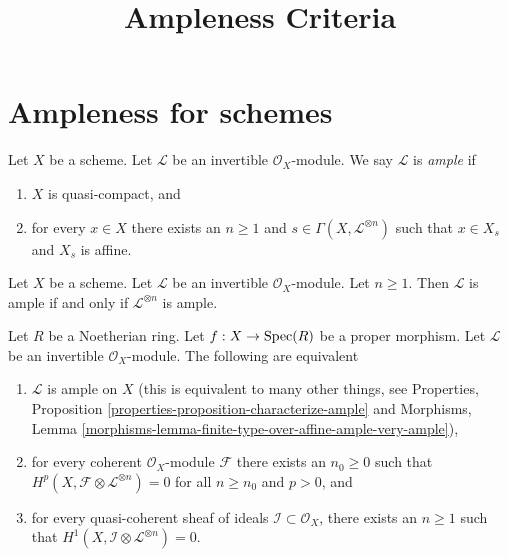 


\newcommand{\todo}[1]{\footnote{\textbf{TODO.} #1}}

\title{Ampleness Criteria}
\maketitle

\section{Ampleness for schemes}

\begin{definition}
\label{definition-ample}
Let $X$ be a scheme.
Let $\mathcal{L}$ be an invertible $\mathcal{O}_X$-module.
We say $\mathcal{L}$ is {\it ample} if
\begin{enumerate}
\item $X$ is quasi-compact, and
\item for every $x \in X$ there exists an $n \geq 1$
and $s \in \Gamma(X, \mathcal{L}^{\otimes n})$ such
that $x \in X_s$ and $X_s$ is affine.
\end{enumerate}
\end{definition}

\begin{lemma}
\label{lemma-ample-power-ample}
Let $X$ be a scheme. Let $\mathcal{L}$ be an invertible $\mathcal{O}_X$-module.
Let $n \geq 1$. Then $\mathcal{L}$ is ample if and only if
$\mathcal{L}^{\otimes n}$ is ample.
\end{lemma}

\begin{lemma}
\label{lemma-vanshing-gives-ample}
Let $R$ be a Noetherian ring. Let $f : X \to \mathop{\rm Spec}(R)$ be a proper morphism.
Let $\mathcal{L}$ be an invertible $\mathcal{O}_X$-module.
The following are equivalent
\begin{enumerate}
\item $\mathcal{L}$ is ample on $X$ (this is equivalent to many other
things, see
Properties, Proposition \ref{properties-proposition-characterize-ample} and
Morphisms, Lemma
\ref{morphisms-lemma-finite-type-over-affine-ample-very-ample}),
\item for every coherent $\mathcal{O}_X$-module $\mathcal{F}$ there exists
an $n_0 \geq 0$ such that
$H^p(X, \mathcal{F} \otimes \mathcal{L}^{\otimes n}) = 0$ for all $n \geq n_0$
and $p > 0$, and
\item for every quasi-coherent sheaf of ideals
$\mathcal{I} \subset \mathcal{O}_X$, there exists an $n \geq 1$
such that $H^1(X, \mathcal{I} \otimes \mathcal{L}^{\otimes n}) = 0$.
\end{enumerate}
\end{lemma}

